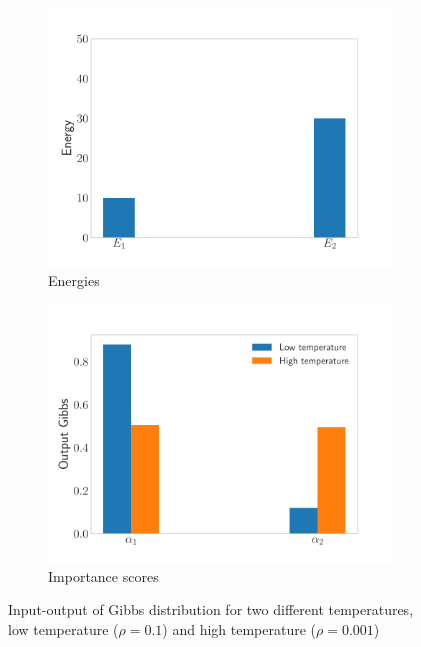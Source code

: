 \begin{figure}[!h]
\centering
\begin{subfigure}{.5\textwidth}
  \centering
  \includegraphics[width=.95\linewidth]{figures/input-gibbs}
  \caption{Energies}
\end{subfigure}%
\begin{subfigure}{.5\textwidth}
  \centering
  \includegraphics[width=.95\linewidth]{figures/result-gibbs}
  \caption{Importance scores}
\end{subfigure}
\caption[Input-output of Gibbs distribution for two different temperatures]{Input-output of Gibbs distribution for two different temperatures, low temperature ($\rho = 0.1$) and high temperature ($\rho = 0.001$)}
\label{fig:gibbs}
\end{figure}


